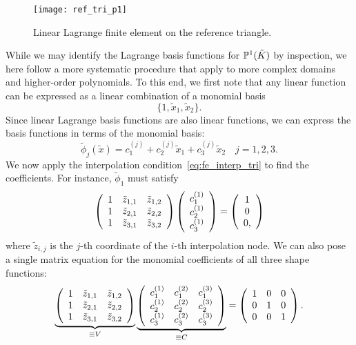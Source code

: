 \begin{figure}
  \centering
  \texttt{[image: ref\_tri\_p1]}
  \caption{Linear Lagrange finite element on the reference triangle.}
  \label{fig:fe_ref_tri_p1}
\end{figure}

    While we may identify the Lagrange basis functions for $\PP^1(\tilde K)$ by inspection, we here follow a more systematic procedure that apply to more complex domains and higher-order polynomials.  To this end, we first note that any linear function can be expressed as a linear combination of a monomial basis
\begin{equation*}
  \{ 1, \tilde x_1, \tilde x_2\}.
\end{equation*}
Since linear Lagrange basis functions are also linear functions, we can express the basis functions in terms of the monomial basis:
\begin{equation}
  \tilde \phi_j(\tilde x) = c^{(j)}_1 + c^{(j)}_2 \tilde x_1 + c_3^{(j)} \tilde x_2 \quad j = 1, 2, 3.
  \label{eq:fe_lin_tri_rep}
\end{equation}
We now apply the interpolation condition~\eqref{eq:fe_interp_tri} to find the coefficients.  For instance, $\tilde \phi_1$ must satisfy
\begin{equation*}
  \bmat{ccc}
  1 & \tilde z_{1,1} & \tilde z_{1,2} \\
  1 & \tilde z_{2,1} & \tilde z_{2,2} \\
  1 & \tilde z_{3,1} & \tilde z_{3,2} \\
  \emat
  \bmat{ccc}
  c_1^{(1)} \\ c_2^{(1)} \\ c_3^{(1)}
  \emat
  =
  \bmat{ccc}
  1 \\ 0 \\ 0,
  \emat
\end{equation*}
where $\tilde z_{i,j}$ is the $j$-th coordinate of the $i$-th interpolation node. We can also pose a single matrix equation for the monomial coefficients of all three shape functions: 
\begin{equation*}
  \underbrace{
   \bmat{ccc}
  1 & \tilde z_{1,1} & \tilde z_{1,2} \\
  1 & \tilde z_{2,1} & \tilde z_{2,2} \\
  1 & \tilde z_{3,1} & \tilde z_{3,2} \\
  \emat }_{\equiv V}
  \underbrace{ 
  \bmat{ccc}
  c_1^{(1)} & c_1^{(2)} & c_1^{(3)} \\
  c_2^{(1)} & c_2^{(2)} & c_2^{(3)} \\
  c_3^{(1)} & c_3^{(2)} & c_3^{(3)} \\
  \emat
  }_{\equiv C}
  =
  \bmat{ccc}
  1 & 0 & 0 \\
  0 & 1 & 0 \\
  0 & 0 & 1
  \emat.
\end{equation*}
